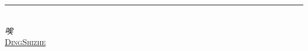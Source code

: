 
\newcommand*{\plogo}{\FiveFlowerOpen}

\newcommand{\Author}{\href{https://github.com/DingShizhe}{DingShizhe}}
\newcommand\myquotepage[3]{\thispagestyle{empty}\vspace*{\fill}\vspace*{\fill}\textcolor{#1}{\textit{#2\\\rightline{#3}}}\vspace*{\fill}\vspace*{\fill}\vspace*{\fill}}

\begin{titlepage}
	\raggedleft
	\rule{1pt}{\textheight} %
	\hspace{0.06\textwidth}
	\parbox[b]{0.80\textwidth}{
		{
            {\fontsize{40}{50}\selectfont
            }
        }\\[2\baselineskip] %
		\textcolor{by}{\large\textit{唉}}\\[4\baselineskip]{\large\textsc{\Author}}
        
		\vspace{0.5\textheight}
		\color{Sienna}{\noindent 且慢~\plogo}\\[\baselineskip]
	}
    
\end{titlepage}